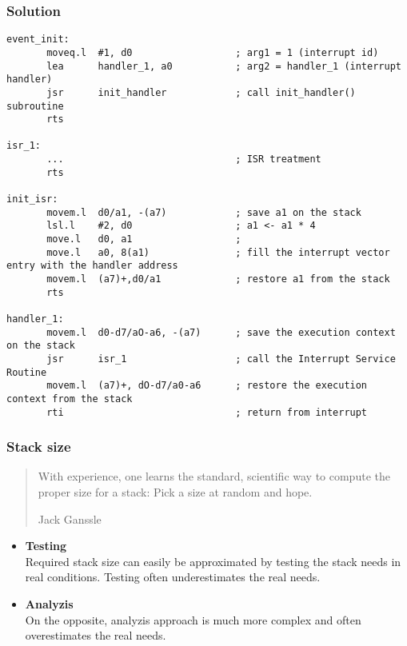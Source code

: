 \begin{frame}[containsverbatim]
  \frametitle{Solution}

  \begin{verbatim}
event_init:
       moveq.l  #1, d0                  ; arg1 = 1 (interrupt id)
       lea      handler_1, a0           ; arg2 = handler_1 (interrupt handler)
       jsr      init_handler            ; call init_handler() subroutine
       rts

isr_1:
       ...                              ; ISR treatment
       rts

init_isr:
       movem.l  d0/a1, -(a7)            ; save a1 on the stack
       lsl.l    #2, d0                  ; a1 <- a1 * 4
       move.l   d0, a1                  ; 
       move.l   a0, 8(a1)               ; fill the interrupt vector entry with the handler address
       movem.l  (a7)+,d0/a1             ; restore a1 from the stack
       rts

handler_1:
       movem.l  d0-d7/aO-a6, -(a7)      ; save the execution context on the stack
       jsr      isr_1                   ; call the Interrupt Service Routine
       movem.l  (a7)+, dO-d7/a0-a6      ; restore the execution context from the stack
       rti                              ; return from interrupt
  \end{verbatim}

\end{frame}

%
%
%

\begin{frame}
  \frametitle{Stack size}

  \begin{quote}
    With experience, one learns the standard, scientific way to compute the
    proper size for a stack: Pick a size at random and hope.

    \begin{flushright}
     Jack Ganssle
    \end{flushright}
  \end{quote}


  \nl

  \begin{itemize}

    \item {\bf Testing}\\
      Required stack size can easily be approximated by testing the stack needs
      in real conditions. Testing often underestimates the real needs.

    \nl

    \item {\bf Analyzis}\\
      On the opposite, analyzis approach is much more complex and often
      overestimates the real needs.
  \end{itemize}

\end{frame}

